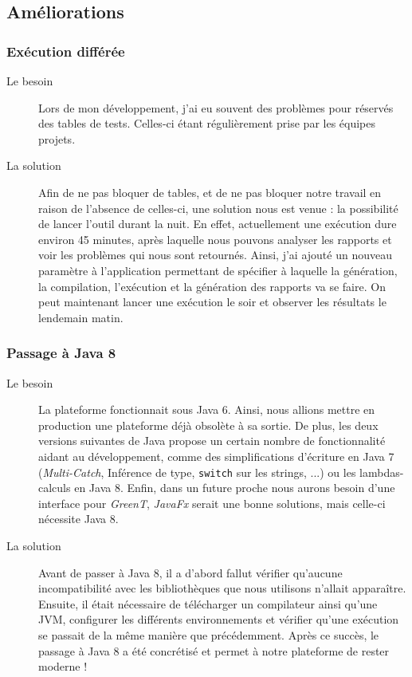 \subsection{Améliorations}
	\subsubsection{Exécution différée} %
	\begin{description}
		\item[Le besoin] Lors de mon développement, j'ai eu souvent des problèmes pour réservés des tables de tests. Celles-ci étant régulièrement prise par les équipes projets. 
		\item[La solution] Afin de ne pas bloquer de tables, et de ne pas bloquer notre travail en raison de l'absence de celles-ci, une solution nous est venue : la possibilité de lancer l'outil durant la nuit. En effet, actuellement une exécution dure environ 45 minutes, après laquelle nous pouvons analyser les rapports et voir les problèmes qui nous sont retournés. Ainsi, j'ai ajouté un nouveau paramètre à l'application permettant de spécifier à laquelle la génération, la compilation, l'exécution et la génération des rapports va se faire. On peut maintenant lancer une exécution le soir et observer les résultats le lendemain matin.
	\end{description}
	
	\subsubsection{Passage à Java 8}
		\begin{description}
			\item[Le besoin] La plateforme fonctionnait sous Java 6. Ainsi, nous allions mettre en production une plateforme déjà obsolète à sa sortie. De plus, les deux versions suivantes de Java propose un certain nombre de fonctionnalité aidant au développement, comme des simplifications d'écriture en Java 7 (\textit{Multi-Catch}, Inférence de type, \texttt{switch} sur les strings, ...) ou les lambdas-calculs en Java 8. Enfin, dans un future proche nous aurons besoin d'une interface pour \textit{GreenT}, \textit{JavaFx} serait une bonne solutions, mais celle-ci nécessite Java 8.
			\item[La solution] Avant de passer à Java 8, il a d'abord fallut vérifier qu'aucune incompatibilité avec les bibliothèques que nous utilisons n'allait apparaître. Ensuite, il était nécessaire de télécharger un compilateur ainsi qu'une JVM, configurer les différents environnements et vérifier qu'une exécution se passait de la même manière que précédemment. Après ce succès, le passage à Java 8 a été concrétisé et permet à notre plateforme de rester moderne ! 
		\end{description}
		
